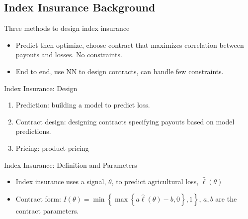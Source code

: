 \documentclass{beamer}
\begin{document}
\subsection{Index Insurance Background}
\begin{frame}{Three methods to design index insurance}
\begin{itemize}
    \setlength\itemsep{1em}
    \item Predict then optimize, choose contract that maximizes correlation between payouts and losses. No constraints. 
    \item End to end, use NN to design contracts, can handle few constraints. 
\end{itemize}
\end{frame} 

\begin{frame}{Index Insurance: Design}
\begin{enumerate}
    \setlength\itemsep{1em}
    \item Prediction: building a model to predict loss. 
    \item Contract design: designing contracts specifying payouts based on model predictions.
    \item Pricing: product pricing
\end{enumerate}
\end{frame} 

\begin{frame}{Index Insurance: Definition and Parameters}
\begin{itemize}
    \setlength\itemsep{1em}
    \item Index insurance uses a signal, $\theta$, to predict agricultural loss, $\hat{\ell}(\theta)$
    \item Contract form: $I(\theta) = \min \left \{ \max \left \{a\hat{\ell}(\theta) - b,0 \right \}, 1 \right \}$, $a,b$ are the contract parameters.
\end{itemize}
\end{frame}
\end{document}
